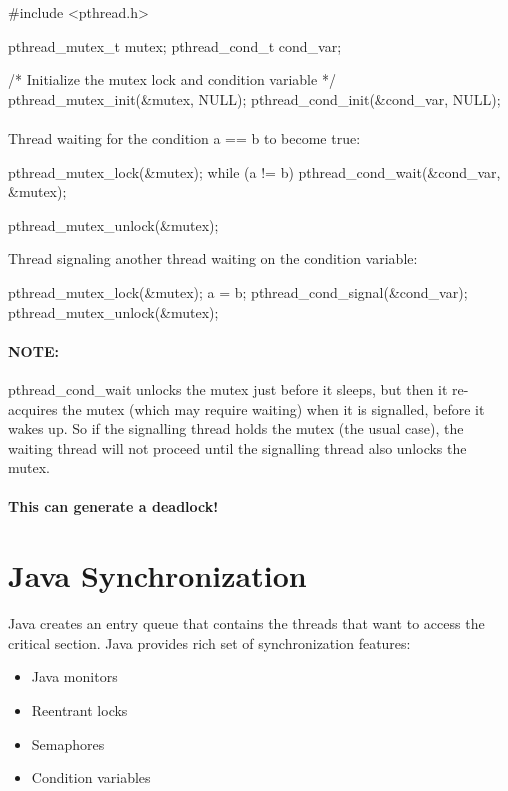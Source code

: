 \begin{codeInC}
#include <pthread.h>

pthread_mutex_t mutex;
pthread_cond_t cond_var;

/* Initialize the mutex lock and condition variable */
pthread_mutex_init(&mutex, NULL);
pthread_cond_init(&cond_var, NULL);

\end{codeInC}
\paragraph{}
Thread waiting for the condition a == b to become true:

\begin{codeInC}
pthread_mutex_lock(&mutex);
while (a != b)
    pthread_cond_wait(&cond_var, &mutex);
    
pthread_mutex_unlock(&mutex);

\end{codeInC}

Thread signaling another thread waiting on the condition variable:

\begin{codeInC}
pthread_mutex_lock(&mutex);
a = b;
pthread_cond_signal(&cond_var);
pthread_mutex_unlock(&mutex);
\end{codeInC}

\paragraph{NOTE: } pthread\_cond\_wait unlocks the mutex just before it sleeps, but then it re-acquires the
mutex (which may require waiting) when it is signalled, before it wakes up.
So if the signalling thread holds the mutex (the usual case), the waiting thread will not
proceed until the signalling thread also unlocks the mutex.
\paragraph{}
\textbf{This can generate a deadlock!} 

\newpage
\section{Java Synchronization}
Java creates an entry queue that contains the threads that want to access the critical section. Java provides rich set of synchronization features:

\begin{itemize}
    \item Java monitors
    \item Reentrant locks
    \item Semaphores
    \item Condition variables
\end{itemize}

